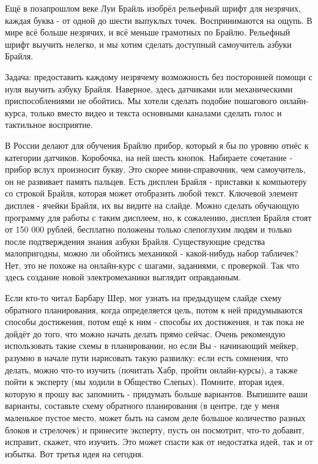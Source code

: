 \documentclass[a4paper,12pt]{article} %
\begin{document}
Ещё в позапрошлом веке Луи Брайль изобрёл рельефный шрифт для незрячих, каждая буква - от одной до шести выпуклых точек. Воспринимаются на ощупь. В мире всё больше незрячих, и всё меньше грамотных по Брайлю. Рельефный шрифт выучить нелегко, и мы хотим сделать доступный самоучитель азбуки Брайля.

Задача: предоставить каждому незрячему возможность без посторонней помощи с нуля выучить азбуку Брайля. Наверное, здесь датчиками или механическими приспособлениями не обойтись. Мы хотели сделать подобие пошагового онлайн-курса, только вместо видео и текста основными каналами сделать голос и тактильное восприятие.

В России делают для обучения Брайлю прибор, который я бы по уровню отнёс к категории датчиков. Коробочка, на ней шесть кнопок. Набираете сочетание - прибор вслух произносит букву. Это скорее мини-справочник, чем самоучитель, он не развивает память пальцев. Есть дисплеи Брайля - приставки к компьютеру со строкой Брайля, которая может отобразить любой текст. Ключевой элемент дисплея - ячейки Брайля, их вы видите на слайде. Можно сделать обучающую программу для работы с таким дисплеем, но, к сожалению, дисплеи Брайля стоят от 150 000 рублей, бесплатно положены только слепоглухим людям и только после подтверждения знания азбуки Брайля. Существующие средства малопригодны, можно ли обойтись механикой - какой-нибудь набор табличек? Нет, это не похоже на онлайн-курс с шагами, заданиями, с проверкой. Так что здесь создание новой электромеханики выглядит оправданным.

Если кто-то читал Барбару Шер, мог узнать на предыдущем слайде схему обратного планирования, когда определяется цель, потом к ней придумываются способы достижения, потом ещё к ним - способы их достижения, и так пока не дойдёт до того, что можно начать делать прямо сейчас. Очень рекомендую использовать такие схемы в планировании, но если Вы - начинающий мейкер, разумно в начале пути нарисовать такую развилку: если есть сомнения, что делать, можно что-то изучить (почитать Хабр, пройти онлайн-курсы), а также пойти к эксперту (мы ходили в Общество Слепых). Помните, вторая идея, которую я прошу вас запомнить - придумать больше вариантов. Выпишите ваши варианты, составьте схему обратного планирования (в центре, где у меня маленькое пустое место, может быть на самом деле большое количество разных блоков и стрелочек) и принесите эксперту, пусть он посмотрит, что-то добавит, исправит, скажет, что изучить. Это может спасти как от недостатка идей, так и от избытка. Вот третья идея на сегодня.
\end{document}
